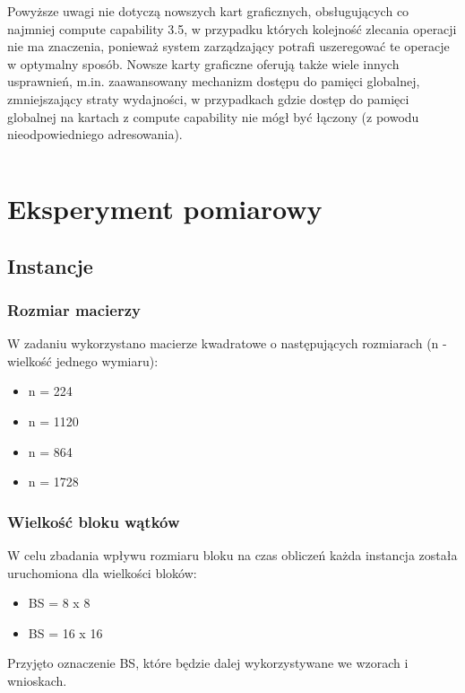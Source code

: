 \documentclass[12pt,a4paper]{article}
\begin{document}
Powyższe uwagi nie dotyczą nowszych kart graficznych, obsługujących co najmniej compute capability 3.5, w przypadku których kolejność zlecania operacji nie ma znaczenia, ponieważ system zarządzający potrafi uszeregować te operacje w optymalny sposób. Nowsze karty graficzne oferują także wiele innych usprawnień, m.in. zaawansowany mechanizm dostępu do pamięci globalnej, zmniejszający straty wydajności, w przypadkach gdzie dostęp do pamięci globalnej na kartach z compute capability nie mógł być łączony (z powodu nieodpowiedniego adresowania).


\begin{listing}[H]
\inputminted{cuda}{listings/invocation_async.cu}
\caption{Wywołanie kernela, wersja 5, zrównoleglenie obliczeń i transferu danych}
\label{lst:async}
\end{listing}


\section{Eksperyment pomiarowy}

\subsection{Instancje}

\subsubsection*{Rozmiar macierzy}
W zadaniu wykorzystano macierze kwadratowe o następujących rozmiarach (n - wielkość jednego wymiaru):
\begin{itemize}
\item n = 224
\item n = 1120
\item n = 864
\item n = 1728
\end{itemize}

\subsubsection*{Wielkość bloku wątków}

W celu zbadania wpływu rozmiaru bloku na czas obliczeń każda instancja została uruchomiona dla wielkości bloków:
\begin{itemize}
\item BS = 8 x 8
\item BS = 16 x 16
\end{itemize}
{\footnotesize Przyjęto oznaczenie BS, które będzie dalej wykorzystywane we wzorach i wnioskach.}
\end{document}

